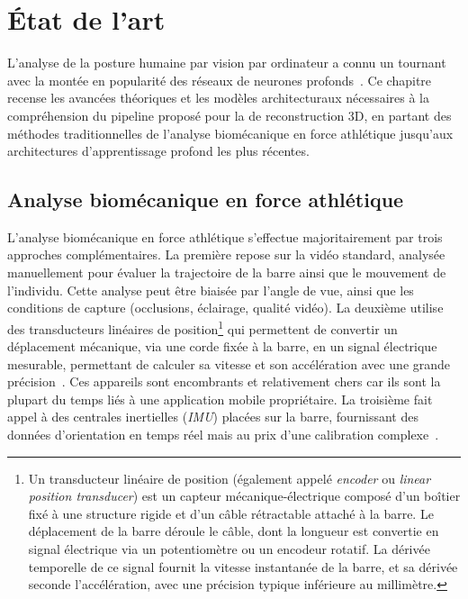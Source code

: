 \chapter{État de l'art} \label{ch_two}

L'analyse de la posture humaine par vision par ordinateur a connu un tournant avec la montée en popularité des réseaux de neurones profonds~\cite{Human-Pose-Estimation-2021}. Ce chapitre recense les avancées théoriques et les modèles architecturaux nécessaires à la compréhension du pipeline proposé pour la de reconstruction 3D, en partant des méthodes traditionnelles de l'analyse biomécanique en force athlétique jusqu'aux architectures d'apprentissage profond les plus récentes.

\section{Analyse biomécanique en force athlétique} 

L'analyse biomécanique en force athlétique s'effectue majoritairement par trois approches complémentaires. La première repose sur la vidéo standard, analysée manuellement pour évaluer la trajectoire de la barre ainsi que le mouvement de l'individu. Cette analyse peut être biaisée par l'angle de vue, ainsi que les conditions de capture (occlusions, éclairage, qualité vidéo). La deuxième utilise des transducteurs linéaires de position\footnote{Un transducteur linéaire de position (également appelé \emph{encoder} ou \emph{linear position transducer}) est un capteur mécanique-électrique composé d'un boîtier fixé à une structure rigide et d'un câble rétractable attaché à la barre. Le déplacement de la barre déroule le câble, dont la longueur est convertie en signal électrique via un potentiomètre ou un encodeur rotatif. La dérivée temporelle de ce signal fournit la vitesse instantanée de la barre, et sa dérivée seconde l'accélération, avec une précision typique inférieure au millimètre.} qui permettent de convertir un déplacement mécanique, via une corde fixée à la barre, en un signal électrique mesurable, permettant de calculer sa vitesse et son accélération avec une grande précision~\cite{MorenoVillanueva2021}. Ces appareils sont encombrants et relativement chers car ils sont la plupart du temps liés à une application mobile propriétaire. La troisième fait appel à des centrales inertielles (\textit{IMU}) placées sur la barre, fournissant des données d'orientation en temps réel mais au prix d'une calibration complexe~\cite{Abbott2020, Camomilla2018}.

